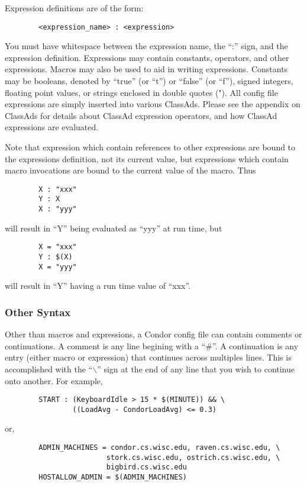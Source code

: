 Expression definitions are of the form:
\begin{verbatim}
        <expression_name> : <expression>
\end{verbatim}
\Note You must have whitespace between the expression name,
the ``:'' sign, and the expression definition.  Expressions may
contain constants, operators, and other expressions.  Macros may also
be used to aid in writing expressions.  Constants may be booleans,
denoted by ``true'' (or ``t'') or ``false'' (or ``f''), signed
integers, floating point values, or strings enclosed in double quotes
(").  All config file expressions are simply inserted into various
ClassAds.  Please see the appendix on ClassAds for details about
ClassAd expression operators, and how ClassAd expressions are
evaluated.

Note that expression which contain references to other expressions are
bound to the expressions definition, not its current value, but
expressions which contain macro invocations are bound to the current
value of the macro.  Thus
\begin{verbatim}
        X : "xxx"
        Y : X
        X : "yyy"
\end{verbatim}
will result in ``Y'' being evaluated as ``yyy'' at run time, but
\begin{verbatim}
        X = "xxx"
        Y : $(X)
        X = "yyy" 
\end{verbatim}
will result in ``Y'' having a run time value of ``xxx''.

\subsubsection{\label{sec:Other-Syntax}
Other Syntax}

Other than macros and expressions, a Condor config file can contain
comments or continuations.  A comment is any line begining with a
``\#''.  A continuation is any entry (either macro or expression) that
continues across multiples lines.  This is accomplished with the
``$\backslash$'' sign at the end of any line that you wish to continue onto
another.  For example,
\begin{verbatim}
        START : (KeyboardIdle > 15 * $(MINUTE)) && \
                ((LoadAvg - CondorLoadAvg) <= 0.3)
\end{verbatim}
or,
\begin{verbatim}
        ADMIN_MACHINES = condor.cs.wisc.edu, raven.cs.wisc.edu, \
                        stork.cs.wisc.edu, ostrich.cs.wisc.edu, \
                        bigbird.cs.wisc.edu
        HOSTALLOW_ADMIN = $(ADMIN_MACHINES)
\end{verbatim}

